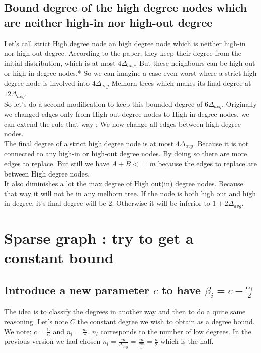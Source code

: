\documentclass{article}
\begin{document}
\subsection{Bound degree of the high degree nodes which are neither high-in nor high-out degree}

Let's call strict High degree node an high degree node which is neither
high-in nor high-out degree. According to the paper, they keep their
degree from the initial distribution, which is at most $4\Delta_{avg}$.
But these neighbours can be high-out or high-in degree nodes.*
So we can imagine a case even worst where a strict high degree node
is involved into $4\Delta_{avg}$ Melhorn trees which makes its
final degree at $12\Delta_{avg}$.\\

So let's do a second modification to keep this bounded degree of $6\Delta_{avg}$.
Originally we changed edges only from High-out degree nodes
to High-in degree nodes. we can extend the rule that way :
We now change all edges between high degree nodes.\\

The final degree of a strict high degree node is at most $4\Delta_{avg}$.
Because it is not connected to any high-in or high-out degree nodes.
By doing so there are more edges to replace.
But still we have $ A + B <= m$
because the edges to replace are between High degree nodes.\\

It also diminishes a lot the max degree of High out(in) degree nodes.
Because that way it will not be in any melhorn tree.
If the node is both high out and high in degree, it's final degree will
be 2. Otherwise it will be inferior to $1+2\Delta_{avg}$.

\newpage
\section{Sparse graph : try to get a constant bound}

\subsection{Introduce a new parameter $c$ to have $\beta_i=c-\frac{\alpha_i}{2}$}

The idea is to classify the degrees in another way and then to do a
quite same reasoning. Let's note $C$ the constant degree we wish to
obtain as a degree bound. We note: $c = \frac{C}{6}$ and $n_l = \frac{m}{c}$.
$n_l$ corresponds to the number of low degrees. In the previous version
we had chosen $n_l = \frac{m}{\Delta_{avg}} = \frac{m}{\frac{2m}{n}} = \frac{n}{2}$
which is the half.\\
\end{document}

